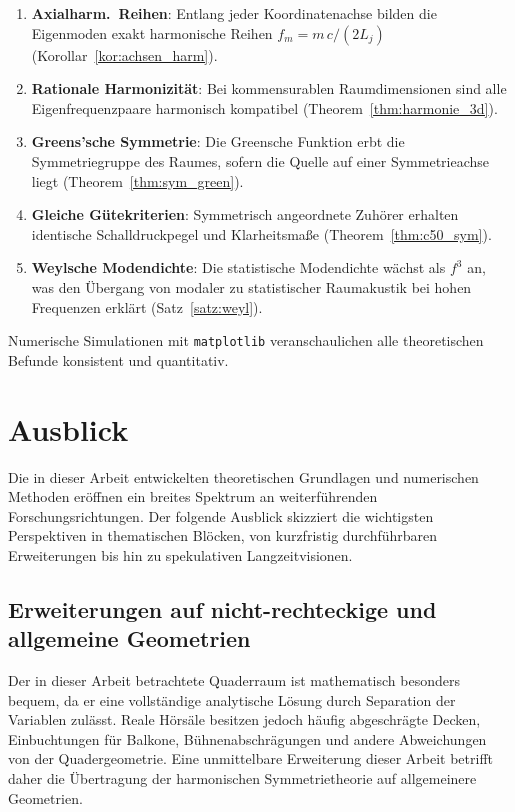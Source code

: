 ﻿\documentclass[12pt, a4paper]{article}
\theoremstyle{definition}
\theoremstyle{remark}
\begin{document}
\begin{enumerate}
\item \textbf{Axialharm.\ Reihen}: Entlang jeder Koordinatenachse bilden
  die Eigenmoden exakt harmonische Reihen $f_m = m\,c/(2L_j)$
  (Korollar~\ref{kor:achsen_harm}).

\item \textbf{Rationale Harmonizität}: Bei kommensurablen Raumdimensionen
  sind alle Eigenfrequenzpaare harmonisch kompatibel
  (Theorem~\ref{thm:harmonie_3d}).

\item \textbf{Greens'sche Symmetrie}: Die Greensche Funktion erbt die
  Symmetriegruppe des Raumes, sofern die Quelle auf einer Symmetrieachse liegt
  (Theorem~\ref{thm:sym_green}).

\item \textbf{Gleiche Gütekriterien}: Symmetrisch angeordnete Zuhörer
  erhalten identische Schalldruckpegel und Klarheitsmaße
  (Theorem~\ref{thm:c50_sym}).

\item \textbf{Weylsche Modendichte}: Die statistische Modendichte wächst
  als $f^3$ an, was den Übergang von modaler zu statistischer Raumakustik
  bei hohen Frequenzen erklärt (Satz~\ref{satz:weyl}).
\end{enumerate}

Numerische Simulationen mit \texttt{matplotlib} veranschaulichen alle
theoretischen Befunde konsistent und quantitativ.

\section{Ausblick}
\label{sec:ausblick}

Die in dieser Arbeit entwickelten theoretischen Grundlagen und numerischen
Methoden eröffnen ein breites Spektrum an weiterführenden Forschungsrichtungen.
Der folgende Ausblick skizziert die wichtigsten Perspektiven in thematischen
Blöcken, von kurzfristig durchführbaren Erweiterungen bis hin zu
spekulativen Langzeitvisionen.

\subsection{Erweiterungen auf nicht-rechteckige und allgemeine Geometrien}

Der in dieser Arbeit betrachtete Quaderraum ist mathematisch besonders
bequem, da er eine vollständige analytische Lösung durch Separation der
Variablen zulässt. Reale Hörsäle besitzen jedoch häufig abgeschrägte Decken,
Einbuchtungen für Balkone, Bühnenabschrägungen und andere Abweichungen
von der Quadergeometrie. Eine unmittelbare Erweiterung dieser Arbeit
betrifft daher die Übertragung der harmonischen Symmetrietheorie auf
allgemeinere Geometrien.
\end{document}

